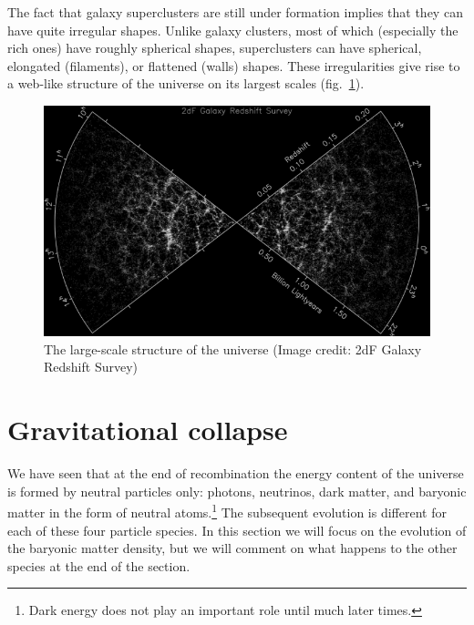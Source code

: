 \documentclass[11pt, a4paper,oneside,openright]{book}
\numberwithin{equation}{section}
\begin{document}
The fact that galaxy superclusters are still under formation implies that they can have quite irregular shapes. Unlike galaxy clusters, most of which (especially the rich ones) have roughly spherical shapes, superclusters can have spherical, elongated (filaments), or flattened (walls) shapes. These irregularities give rise to a web-like structure of the universe on its largest scales (fig.\ \ref{fig:lec8_2}).
\begin{figure}[ht]
\begin{center}
\includegraphics[scale=0.4]{Draw/lec8_2.png}
\end{center}
\caption{The large-scale structure of the universe (Image credit: 2dF Galaxy Redshift Survey)}
\label{fig:lec8_2}
\end{figure}


\section{Gravitational collapse}

We have seen that at the end of recombination the energy content of the universe is formed by neutral particles only: photons, neutrinos, dark matter, and baryonic matter in the form of neutral atoms.\footnote{Dark energy does not play an important role until much later times.} The subsequent evolution is different for each of these four particle species. In this section we will focus on the evolution of the baryonic matter density, but we will comment on what happens to the other species at the end of the section.
\end{document}
